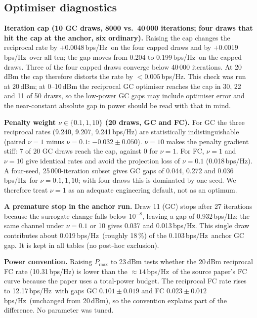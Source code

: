 \documentclass[10pt,a4paper]{article}
\newcommand{\bpsHz}{bps/Hz}
\begin{document}
\subsection{Optimiser diagnostics}
\textbf{Iteration cap (10 GC draws, 8000 vs.\ 40\,000 iterations; four draws that hit the cap at the anchor, six ordinary).} Raising the cap changes the reciprocal rate by $+0.0048$\,\bpsHz\ on the four capped draws and by $+0.0019$\,\bpsHz\ over all ten; the gap moves from 0.204 to 0.199\,\bpsHz\ on the capped draws. Three of the four capped draws converge below 40\,000 iterations. At 20\,dBm the cap therefore distorts the rate by $<0.005$\,\bpsHz. This check was run at 20\,dBm; at 0--10\,dBm the reciprocal GC optimiser reaches the cap in 30, 22 and 11 of 50 draws, so the low-power GC gaps may include optimiser error and the near-constant absolute gap in power should be read with that in mind.

\textbf{Penalty weight $\nu\in\{0.1,1,10\}$ (20 draws, GC and FC).} For GC the three reciprocal rates (9.240, 9.207, 9.241\,\bpsHz) are statistically indistinguishable (paired $\nu{=}1$ minus $\nu{=}0.1$: $-0.032\pm0.050$). $\nu{=}10$ makes the penalty gradient stiff: 7 of 20 GC draws reach the cap, against 0 for $\nu{=}1$. For FC, $\nu{=}1$ and $\nu{=}10$ give identical rates and avoid the projection loss of $\nu{=}0.1$ (0.018\,\bpsHz). A four-seed, 25\,000-iteration subset gives GC gaps of 0.044, 0.272 and 0.036\,\bpsHz\ for $\nu=0.1,1,10$; with four draws this is dominated by one seed. We therefore treat $\nu{=}1$ as an adequate engineering default, not as an optimum.

\textbf{A premature stop in the anchor run.} Draw 11 (GC) stops after 27 iterations because the surrogate change falls below $10^{-8}$, leaving a gap of 0.932\,\bpsHz; the same channel under $\nu=0.1$ or 10 gives 0.037 and 0.013\,\bpsHz. This single draw contributes about 0.019\,\bpsHz\ (roughly 18\,\%) of the 0.103\,\bpsHz\ anchor GC gap. It is kept in all tables (no post-hoc exclusion).

\textbf{Power convention.} Raising $P_{\max}$ to 23\,dBm tests whether the 20\,dBm reciprocal FC rate (10.31\,\bpsHz) is lower than the $\approx14$\,\bpsHz\ of the source paper's FC curve because the paper uses a total-power budget. The reciprocal FC rate rises to 12.17\,\bpsHz\ with gaps GC $0.101\pm0.019$ and FC $0.023\pm0.012$\,\bpsHz\ (unchanged from 20\,dBm), so the convention explains part of the difference. No parameter was tuned.
\end{document}
